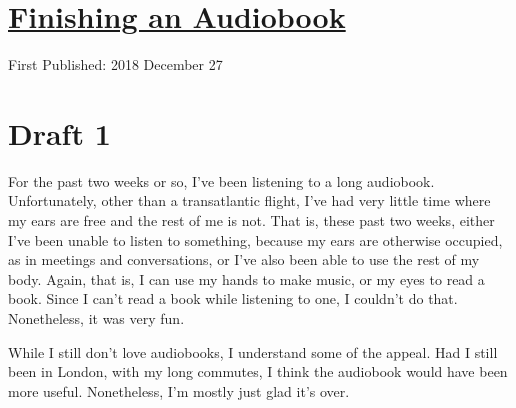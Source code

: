 \documentclass[12pt]{article}[titlepage]
\newcommand{\1}{\={a}}
\newcommand{\2}{\={e}}
\newcommand{\3}{\={\i}}
\newcommand{\4}{\=o}
\newcommand{\5}{\=u}
\newcommand{\6}{\={A}}
\renewcommand{\,}{\textsuperscript{,}}
\begin{document}
\doublespacing
\section{\href{finishing-audiobook.html}{Finishing an Audiobook}}
First Published: 2018 December 27
\section{Draft 1}
For the past two weeks or so, I've been listening to a long audiobook.
Unfortunately, other than a transatlantic flight, I've had very little time where my ears are free and the rest of me is not.
That is, these past two weeks, either I've been unable to listen to something, because my ears are otherwise occupied, as in meetings and conversations, or I've also been able to use the rest of my body.
Again, that is, I can use my hands to make music, or my eyes to read a book.
Since I can't read a book while listening to one, I couldn't do that.
Nonetheless, it was very fun.

While I still don't love audiobooks, I understand some of the appeal.
Had I still been in London, with my long commutes, I think the audiobook would have been more useful.
Nonetheless, I'm mostly just glad it's over.
\end{document}
